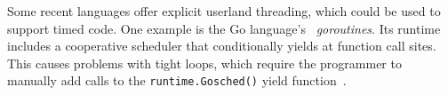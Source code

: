 
Some recent languages offer explicit userland threading, which could be used to
support timed
code.  One example is the Go language's~\cite{www-golang} \textit{goroutines}.
Its runtime includes a cooperative scheduler that conditionally yields
at function call sites.  This causes problems with tight loops, which require the
programmer to manually add calls to the \texttt{runtime.Gosched()}
yield function~\cite{www-golang-tightloop}.

